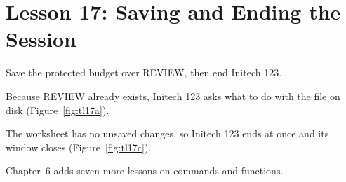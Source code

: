 \section{Lesson 17: Saving and Ending the Session}
Save the protected budget over REVIEW, then end Initech 123.

\begin{Keystrokes}
\end{Keystrokes}
Because REVIEW already exists, Initech 123 asks what to do with the file on
disk (Figure~\ref{fig:tl17a}).
\begin{Keystrokes}
\end{Keystrokes}
The worksheet has no unsaved changes, so Initech 123 ends at once and its
window closes (Figure~\ref{fig:tl17c}).

Chapter~6 adds seven more lessons on commands and functions.
